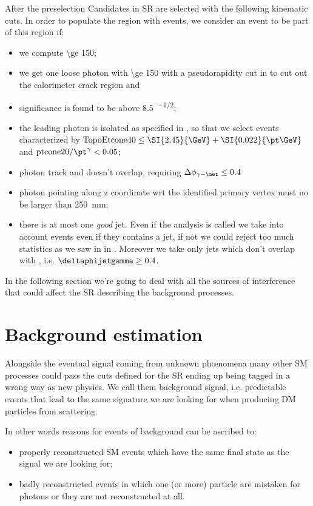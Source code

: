 After the preselection Candidates in SR are selected with the following kinematic cuts. In order to populate the region with \gmet events, we consider an event to be part of this region if:
\begin{itemize}
\item we compute \met \SI{\ge 150}{\gev};
\item we get one loose photon with \pt \SI{\ge 150}{\gev} with a pseudorapidity cut in  to cut out the calorimeter crack region and 
\item \met significance is found to be above \SI{8.5}{\gev^{-1/2}};
\item the leading photon is isolated as specified in \Sect{\ref{sec:phisolation}}, so that we select events characterized by $ \text{TopoEtcone40} \le \SI{2.45}{\GeV} + \SI{0.022}{\pt\GeV}$ and $\text{ptcone20}/\pt^\gamma<0.05$;
\item photon track and \met doesn't overlap, requiring $\Delta\phi_{\gamma - \met} \le 0.4$
\item photon pointing along z coordinate wrt the identified primary vertex must no be larger than \SI{250}{\mm};
\item there is at most one {\itshape good} jet. Even if the analysis is called \mph we take into account events even if they contains a jet, if not we could reject too much statistics as we saw in \Sect{\ref{sec:truth}} in \Fig{\ref{fig:validation}}. Moreover we take only jets which don't overlap with \met, i.e. $\deltaphijetgamma \ge 0.4$.

\end{itemize}

In the following section we're going to deal with all the sources of interference that could affect the SR describing the background processes.

\section{Background estimation}
Alongside the eventual signal coming from unknown ph\oe nomena many other SM processes could pass the cuts defined for the SR ending up being tagged in a wrong way as new physics. We call them background signal, i.e. predictable events that lead to the same signature we are looking for when producing DM particles from \pp scattering.

In other words reasons for events of background can be ascribed to:
\begin{itemize}
\item properly reconstructed SM events which have the same final state as the signal we are looking for;
\item badly reconstructed events in which one (or more) particle are mistaken for photons or they are not reconstructed at all.
\end{itemize}

